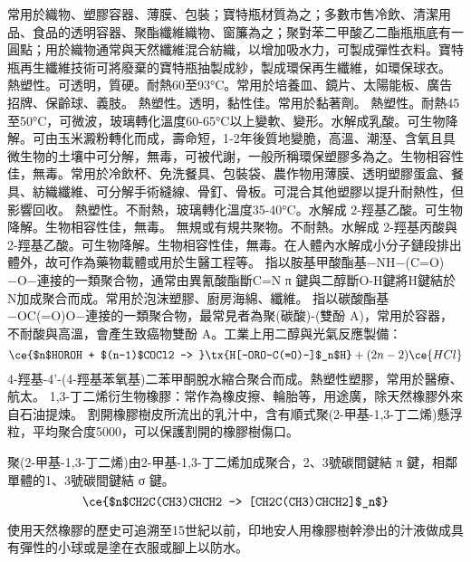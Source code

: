 \documentclass[a4paper,12pt]{report}
\begin{document}
\begin{itemize}
\begin{itemize}
常用於織物、塑膠容器、薄膜、包裝；寶特瓶材質為之；多數市售冷飲、清潔用品、食品的透明容器、聚酯纖維織物、窗簾為之；聚對苯二甲酸乙二酯瓶瓶底有一圓點；用於織物通常與天然纖維混合紡織，以增加吸水力，可製成彈性衣料。寶特瓶再生纖維技術可將廢棄的寶特瓶抽製成紗，製成環保再生纖維，如環保球衣。
熱塑性。可透明，質硬。耐熱60至93°C。常用於培養皿、鏡片、太陽能板、廣告招牌、保齡球、義肢。
熱塑性。透明，黏性佳。常用於黏著劑。
熱塑性。耐熱45至50°C，可微波，玻璃轉化溫度60-65°C以上變軟、變形。水解成乳酸。可生物降解。可由玉米澱粉轉化而成，壽命短，1-2年後質地變脆，高溫、潮溼、含氧且具微生物的土壤中可分解，無毒，可被代謝，一般所稱環保塑膠多為之。生物相容性佳，無毒。常用於冷飲杯、免洗餐具、包裝袋、農作物用薄膜、透明塑膠蛋盒、餐具、紡織纖維、可分解手術縫線、骨釘、骨板。可混合其他塑膠以提升耐熱性，但影響回收。
熱塑性。不耐熱，玻璃轉化溫度35-40°C。水解成 2-羥基乙酸。可生物降解。生物相容性佳，無毒。
無規或有規共聚物。不耐熱。水解成 2-羥基丙酸與 2-羥基乙酸。可生物降解。生物相容性佳，無毒。在人體內水解成小分子鏈段排出體外，故可作為藥物載體或用於生醫工程等。
指以胺基甲酸酯基−NH−(C=O)−O−連接的一類聚合物，通常由異氰酸酯斷C=N π 鍵與二醇斷O-H鍵將H鍵結於N加成聚合而成。常用於泡沫塑膠、廚房海綿、纖維。
指以碳酸酯基−OC(=O)O−連接的一類聚合物，最常見者為聚(碳酸)-(雙酚 A)，常用於容器，不耐酸與高溫，會產生致癌物雙酚 A。工業上用二醇與光氣反應製備：
\[\ce{$n$HOROH + $(n-1)$COCl2 -> }\tx{H[-ORO-C(=O)-]$_n$H} + (2n-2)\ce{HCl}\]
4-羥基-4'-(4-羥基苯氧基)二苯甲酮脫水縮合聚合而成。熱塑性塑膠，常用於醫療、航太。
1,3-丁二烯衍生物橡膠：常作為橡皮擦、輪胎等，用途廣，除天然橡膠外來自石油提煉。
割開橡膠樹皮所流出的乳汁中，含有順式聚(2-甲基-1,3-丁二烯)懸浮粒，平均聚合度5000，可以保護割開的橡膠樹傷口。

聚(2-甲基-1,3-丁二烯)由2-甲基-1,3-丁二烯加成聚合，2、3號碳間鍵結 π 鍵，相鄰單體的1、3號碳間鍵結 σ 鍵。
\[\ce{$n$CH2C(CH3)CHCH2 -> [CH2C(CH3)CHCH2]$_n$}\]

使用天然橡膠的歷史可追溯至15世紀以前，印地安人用橡膠樹幹滲出的汁液做成具有彈性的小球或是塗在衣服或腳上以防水。


\end{itemize}
\end{itemize}
\end{document}
